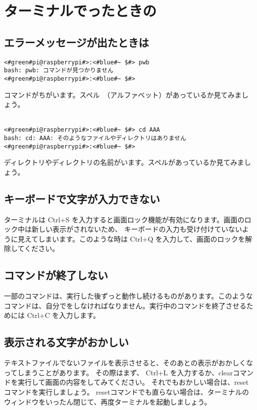 \newpage
\section{ターミナルでったときの}

\subsection{エラーメッセージが出たときは}
\begin{lstlisting}[caption=コマンドがちがうときの例, label=cmdMiss]
<#green#pi@raspberrypi#>:<#blue#~ $#> pwb
bash: pwb: コマンドが見つかりません
<#green#pi@raspberrypi#>:<#blue#~ $#> 
\end{lstlisting}
コマンドがちがいます。スペル　（アルファベット）があっているか見てみましょう。\\\\

\begin{lstlisting}[caption=ディレクトリやファイルの名前がちがうときの例, label=nameMiss]
<#green#pi@raspberrypi#>:<#blue#~ $#> cd AAA
bash: cd: AAA: そのようなファイルやディレクトリはありません
<#green#pi@raspberrypi#>:<#blue#~ $#> 
\end{lstlisting}
ディレクトリやディレクトリの名前がいます。スペルがあっているか見てみましょう。\\

\subsection{キーボードで文字が入力できない}
ターミナルは Ctrl+S を入力すると画面ロック機能が有効になります。画面のロック中は新しい表示がされないため、
キーボードの入力も受け付けていないように見えてしまいます。このような時は Ctrl+Q を入力して、画面のロックを解除してください。

\subsection{コマンドが終了しない}
一部のコマンドは、実行した後ずっと動作し続けるものがあります。このようなコマンドは、自分でをしなければなりません。実行中のコマンドを終了させるためには Ctrl+C を入力します。

\subsection{表示される文字がおかしい}
テキストファイルでないファイルを表示させると、そのあとの表示がおかしくなってしまうことがあります。
その際はまず、 Ctrl+L を入力するか、clearコマンドを実行して画面の内容をしてみてください。
それでもおかしい場合は、reset コマンドを実行しましょう。
resetコマンドでも直らない場合は、ターミナルのウィンドウをいったん閉じて、再度ターミナルを起動しましょう。

